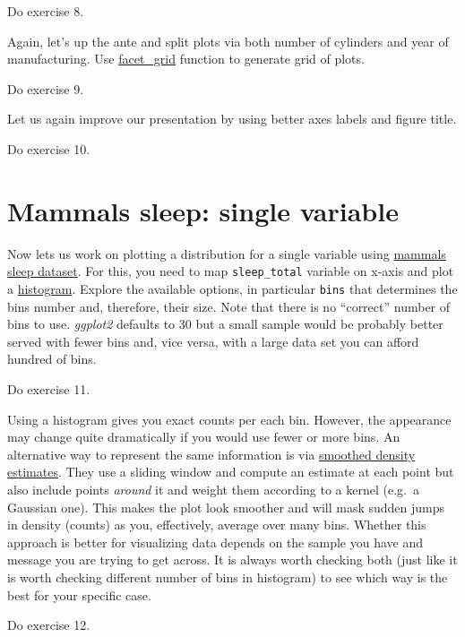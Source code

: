 \documentclass[
]{book}
\begin{document}
Do exercise 8.

Again, let's up the ante and split plots via both number of cylinders and year of manufacturing. Use \href{https://ggplot2.tidyverse.org/reference/facet_grid.html}{facet\_grid} function to generate grid of plots.

Do exercise 9.

Let us again improve our presentation by using better axes labels and figure title.

Do exercise 10.

\hypertarget{mammals-sleep-single-variable}{%
\section{Mammals sleep: single variable}\label{mammals-sleep-single-variable}}

Now lets us work on plotting a distribution for a single variable using \href{https://ggplot2.tidyverse.org/reference/msleep.html}{mammals sleep dataset}. For this, you need to map \texttt{sleep\_total} variable on x-axis and plot a \href{https://ggplot2.tidyverse.org/reference/geom_histogram.html}{histogram}. Explore the available options, in particular \texttt{bins} that determines the bins number and, therefore, their size. Note that there is no ``correct'' number of bins to use. \emph{ggplot2} defaults to 30 but a small sample would be probably better served with fewer bins and, vice versa, with a large data set you can afford hundred of bins.

Do exercise 11.

Using a histogram gives you exact counts per each bin. However, the appearance may change quite dramatically if you would use fewer or more bins. An alternative way to represent the same information is via \href{https://ggplot2.tidyverse.org/reference/geom_density.html}{smoothed density estimates}. They use a sliding window and compute an estimate at each point but also include points \emph{around} it and weight them according to a kernel (e.g.~a Gaussian one). This makes the plot look smoother and will mask sudden jumps in density (counts) as you, effectively, average over many bins. Whether this approach is better for visualizing data depends on the sample you have and message you are trying to get across. It is always worth checking both (just like it is worth checking different number of bins in histogram) to see which way is the best for your specific case.

Do exercise 12.
\end{document}
